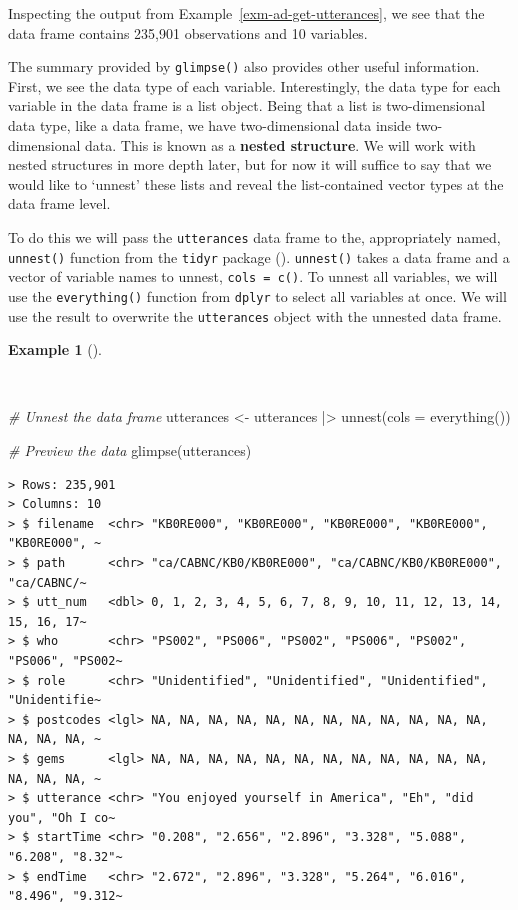 \documentclass[
  letterpaper,
]{latex/krantz}
\newenvironment{Shaded}{\begin{snugshade}}{\end{snugshade}}
\newcommand{\AttributeTok}[1]{\textcolor[rgb]{0.00,0.00,0.00}{#1}}
\newcommand{\CommentTok}[1]{\textcolor[rgb]{0.00,0.00,0.00}{\textit{#1}}}
\newcommand{\FunctionTok}[1]{\textcolor[rgb]{0.00,0.00,0.00}{#1}}
\newcommand{\NormalTok}[1]{\textcolor[rgb]{0.00,0.00,0.00}{#1}}
\newcommand{\OtherTok}[1]{\textcolor[rgb]{0.00,0.00,0.00}{#1}}
\newcommand{\SpecialCharTok}[1]{\textcolor[rgb]{0.00,0.00,0.00}{#1}}
\theoremstyle{definition}
\newtheorem{example}{Example}[chapter]
\theoremstyle{remark}
\begin{document}
Inspecting the output from Example~\ref{exm-ad-get-utterances}, we see
that the data frame contains 235,901 observations and 10 variables.

The summary provided by \texttt{glimpse()} also provides other useful
information. First, we see the data type of each variable.
Interestingly, the data type for each variable in the data frame is a
list object. Being that a list is two-dimensional data type, like a data
frame, we have two-dimensional data inside two-dimensional data. This is
known as a \textbf{nested structure}. We will work with nested
structures in more depth later, but for now it will suffice to say that
we would like to `unnest' these lists and reveal the list-contained
vector types at the data frame level.

To do this we will pass the \texttt{utterances} data frame to the,
appropriately named, \texttt{unnest()} function from the \texttt{tidyr}
package ().
\texttt{unnest()} takes a data frame and a vector of variable names to
unnest, \texttt{cols\ =\ c()}. To unnest all variables, we will use the
\texttt{everything()} function from \texttt{dplyr} to select all
variables at once. We will use the result to overwrite the
\texttt{utterances} object with the unnested data frame.

\begin{example}[]\protect\hypertarget{exm-ad-unnest}{}\label{exm-ad-unnest}

~

\begin{Shaded}
\begin{Highlighting}[]
\CommentTok{\# Unnest the data frame}
\NormalTok{utterances }\OtherTok{\textless{}{-}}
\NormalTok{  utterances }\SpecialCharTok{|\textgreater{}}
  \FunctionTok{unnest}\NormalTok{(}\AttributeTok{cols =} \FunctionTok{everything}\NormalTok{())}

\CommentTok{\# Preview the data}
\FunctionTok{glimpse}\NormalTok{(utterances)}
\end{Highlighting}
\end{Shaded}

\begin{verbatim}
> Rows: 235,901
> Columns: 10
> $ filename  <chr> "KB0RE000", "KB0RE000", "KB0RE000", "KB0RE000", "KB0RE000", ~
> $ path      <chr> "ca/CABNC/KB0/KB0RE000", "ca/CABNC/KB0/KB0RE000", "ca/CABNC/~
> $ utt_num   <dbl> 0, 1, 2, 3, 4, 5, 6, 7, 8, 9, 10, 11, 12, 13, 14, 15, 16, 17~
> $ who       <chr> "PS002", "PS006", "PS002", "PS006", "PS002", "PS006", "PS002~
> $ role      <chr> "Unidentified", "Unidentified", "Unidentified", "Unidentifie~
> $ postcodes <lgl> NA, NA, NA, NA, NA, NA, NA, NA, NA, NA, NA, NA, NA, NA, NA, ~
> $ gems      <lgl> NA, NA, NA, NA, NA, NA, NA, NA, NA, NA, NA, NA, NA, NA, NA, ~
> $ utterance <chr> "You enjoyed yourself in America", "Eh", "did you", "Oh I co~
> $ startTime <chr> "0.208", "2.656", "2.896", "3.328", "5.088", "6.208", "8.32"~
> $ endTime   <chr> "2.672", "2.896", "3.328", "5.264", "6.016", "8.496", "9.312~
\end{verbatim}

\end{example}
\end{document}
